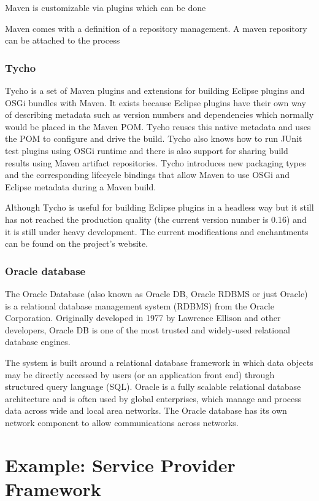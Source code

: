 Maven is customizable via plugins which can be done

Maven comes with a definition of a repository management. A maven repository can
be attached to the process


\subsubsection{Tycho}
Tycho is a set of Maven plugins and extensions for building Eclipse plugins and
OSGi bundles with Maven. It exists because Eclipse plugins have their own way of
describing metadata such as version numbers and dependencies which normally
would be placed in the Maven POM. Tycho reuses this native metadata 
and uses the POM to configure and drive the build. Tycho also knows
how to run JUnit test plugins using OSGi runtime and there is also support for
sharing build results using Maven artifact repositories. Tycho introduces
new packaging types and the corresponding lifecycle bindings that allow Maven to
use OSGi and Eclipse metadata during a Maven build.

Although Tycho is useful for building Eclipse plugins in a headless way but it
still has not reached the production quality (the current version number is
0.16) and it is still under heavy development. The current modifications and
enchantments can be found on the project's website.


\subsubsection{Oracle database}
The Oracle Database (also known as Oracle DB, Oracle RDBMS or just Oracle) is a
relational database management system (RDBMS) from the Oracle Corporation.
Originally developed in 1977 by Lawrence Ellison and other developers, Oracle DB
is one of the most trusted and widely-used relational database engines.

The system is built around a relational database framework in which data objects
may be directly accessed by users (or an application front end) through
structured query language (SQL). Oracle is a fully scalable relational database
architecture and is often used by global enterprises, which manage and process
data across wide and local area networks. The Oracle database has its own
network component to allow communications across networks.


\section{Example: Service Provider Framework}

